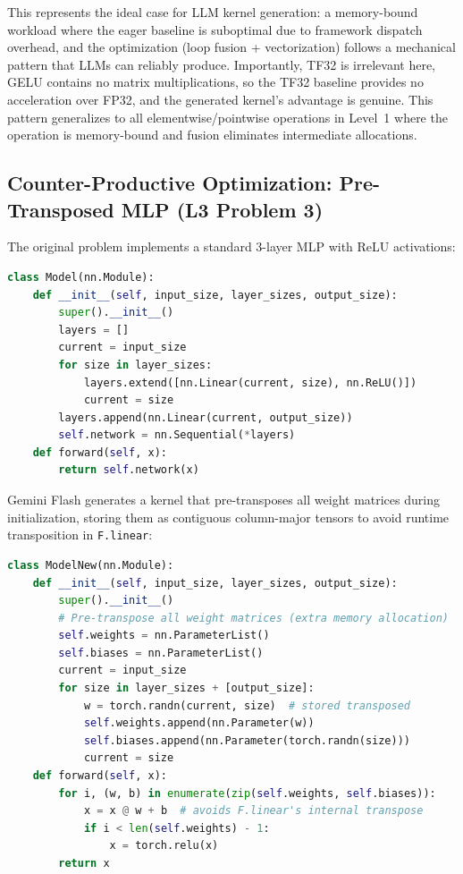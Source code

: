 \documentclass[]{fairmeta}
\begin{document}
This represents the ideal case for LLM kernel generation: a memory-bound workload where the eager baseline is suboptimal due to framework dispatch overhead, and the optimization (loop fusion + vectorization) follows a mechanical pattern that LLMs can reliably produce. Importantly, TF32 is irrelevant here, GELU contains no matrix multiplications, so the TF32 baseline provides no acceleration over FP32, and the generated kernel's advantage is genuine. This pattern generalizes to all elementwise/pointwise operations in Level~1 where the operation is memory-bound and fusion eliminates intermediate allocations.

\subsection{Counter-Productive Optimization: Pre-Transposed MLP (L3 Problem 3)}\label{app:counter}

The original problem implements a standard 3-layer MLP with ReLU activations:
\begin{lstlisting}[language=Python,caption={Original Problem 3: A 3-layer MLP. Each \texttt{nn.Linear} call dispatches to cuBLAS internally.}]
class Model(nn.Module):
    def __init__(self, input_size, layer_sizes, output_size):
        super().__init__()
        layers = []
        current = input_size
        for size in layer_sizes:
            layers.extend([nn.Linear(current, size), nn.ReLU()])
            current = size
        layers.append(nn.Linear(current, output_size))
        self.network = nn.Sequential(*layers)
    def forward(self, x):
        return self.network(x)
\end{lstlisting}

Gemini Flash generates a kernel that pre-transposes all weight matrices during initialization, storing them as contiguous column-major tensors to avoid runtime transposition in \texttt{F.linear}:
\begin{lstlisting}[language=Python,caption={Gemini Flash's counter-productive optimization. Pre-transposes weights to avoid implicit transposition in \texttt{F.linear}, but cuBLAS already handles this efficiently on H200.}]
class ModelNew(nn.Module):
    def __init__(self, input_size, layer_sizes, output_size):
        super().__init__()
        # Pre-transpose all weight matrices (extra memory allocation)
        self.weights = nn.ParameterList()
        self.biases = nn.ParameterList()
        current = input_size
        for size in layer_sizes + [output_size]:
            w = torch.randn(current, size)  # stored transposed
            self.weights.append(nn.Parameter(w))
            self.biases.append(nn.Parameter(torch.randn(size)))
            current = size
    def forward(self, x):
        for i, (w, b) in enumerate(zip(self.weights, self.biases)):
            x = x @ w + b  # avoids F.linear's internal transpose
            if i < len(self.weights) - 1:
                x = torch.relu(x)
        return x
\end{lstlisting}
\end{document}
